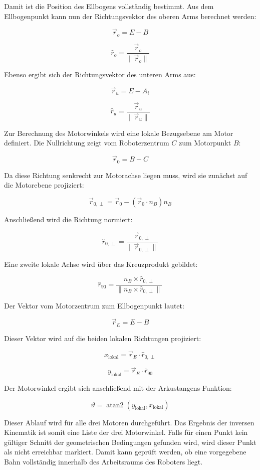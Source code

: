 Damit ist die Position des Ellbogens vollständig bestimmt. 
Aus dem Ellbogenpunkt kann nun der Richtungsvektor des oberen Arms berechnet werden:

\[
\vec{r}_o = E - B
\]

\[
\hat{r}_o = \frac{\vec{r}_o}{\lVert \vec{r}_o \rVert}
\]

Ebenso ergibt sich der Richtungsvektor des unteren Arms aus:

\[
\vec{r}_u = E - A_i
\]

\[
\hat{r}_u = \frac{\vec{r}_u}{\lVert \vec{r}_u \rVert}
\]

Zur Berechnung des Motorwinkels wird eine lokale Bezugsebene am Motor definiert. 
Die Nullrichtung zeigt vom Roboterzentrum \(C\) zum Motorpunkt \(B\):

\[
\vec{r}_0 = B - C
\]

Da diese Richtung senkrecht zur Motorachse liegen muss, wird sie zunächst auf die Motorebene projiziert:

\[
\vec{r}_{0,\perp}
=
\vec{r}_0
-
(\vec{r}_0 \cdot n_B)n_B
\]

Anschließend wird die Richtung normiert:

\[
\hat{r}_{0,\perp}
=
\frac{\vec{r}_{0,\perp}}{\lVert \vec{r}_{0,\perp} \rVert}
\]

Eine zweite lokale Achse wird über das Kreuzprodukt gebildet:

\[
\hat{r}_{90}
=
\frac{n_B \times \hat{r}_{0,\perp}}
{\lVert n_B \times \hat{r}_{0,\perp} \rVert}
\]

Der Vektor vom Motorzentrum zum Ellbogenpunkt lautet:

\[
\vec{r}_E = E - B
\]

Dieser Vektor wird auf die beiden lokalen Richtungen projiziert:

\[
x_\text{lokal} = \vec{r}_E \cdot \hat{r}_{0,\perp}
\]

\[
y_\text{lokal} = \vec{r}_E \cdot \hat{r}_{90}
\]

Der Motorwinkel ergibt sich anschließend mit der Arkustangens-Funktion:

\[
\vartheta = \operatorname{atan2}(y_\text{lokal}, x_\text{lokal})
\]

Dieser Ablauf wird für alle drei Motoren durchgeführt. 
Das Ergebnis der inversen Kinematik ist somit eine Liste der drei Motorwinkel.
Falls für einen Punkt kein gültiger Schnitt der geometrischen Bedingungen gefunden wird, wird dieser Punkt als nicht erreichbar markiert. 
Damit kann geprüft werden, ob eine vorgegebene Bahn vollständig innerhalb des Arbeitsraums des Roboters liegt.


